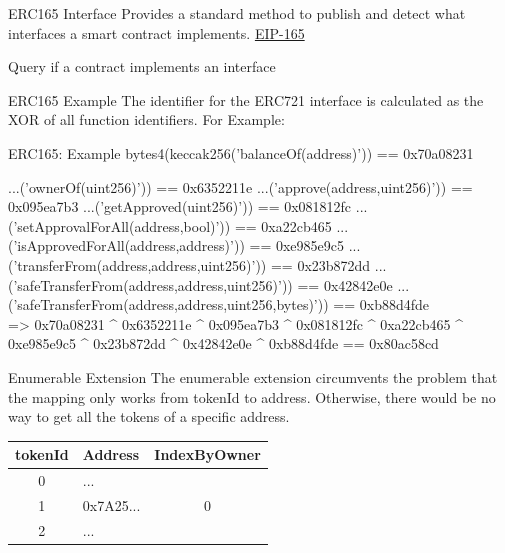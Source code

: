 \documentclass[handout]{beamer}
\begin{document}
\begin{frame}{ERC165 Interface}
Provides a standard method to publish and detect what interfaces a smart contract implements. \link \href{https://eips.ethereum.org/EIPS/eip-165}{EIP-165}
\vspace{1em}
	\begin{samplecode}{Query if a contract implements an interface}
			
	\end{samplecode}

\end{frame}


\begin{frame}{ERC165 Example}
The identifier for the ERC721 interface is calculated as the XOR of all function identifiers.
For Example:
\begin{samplecode}{ERC165: Example}
 bytes4(keccak256('balanceOf(address)')) == 0x70a08231
 
...('ownerOf(uint256)')) == 0x6352211e
...('approve(address,uint256)')) == 0x095ea7b3
...('getApproved(uint256)')) == 0x081812fc
...('setApprovalForAll(address,bool)')) == 0xa22cb465
...('isApprovedForAll(address,address)')) == 0xe985e9c5
...('transferFrom(address,address,uint256)')) == 0x23b872dd
...('safeTransferFrom(address,address,uint256)')) == 0x42842e0e
...('safeTransferFrom(address,address,uint256,bytes)')) == 0xb88d4fde\\

=> 0x70a08231 \textasciicircum{} 0x6352211e \textasciicircum{} 0x095ea7b3 \textasciicircum{} 0x081812fc \textasciicircum{} 0xa22cb465 \textasciicircum{} 0xe985e9c5 \textasciicircum{} 0x23b872dd \textasciicircum{} 0x42842e0e \textasciicircum{} 0xb88d4fde == 0x80ac58cd
\end{samplecode}
\end{frame}

\begin{frame}{Enumerable Extension}
The enumerable extension circumvents the problem that the mapping only works from tokenId to address. Otherwise, there would be no way to get all the tokens of a specific address.
\vspace{0.5em}
		\begin{table}
			\begin{tabular}{c|l|c}
			tokenId & Address & IndexByOwner\\
			\hline
			0 & \color{focus}{0x0901}... & \color{focus}{0} \\
			1 & 0x7A25... & 0 \\
			2 & \color{focus}{0x0901}... & \color{focus}{1}
			\end{tabular}
		\end{table}
\end{frame}
\end{document}
